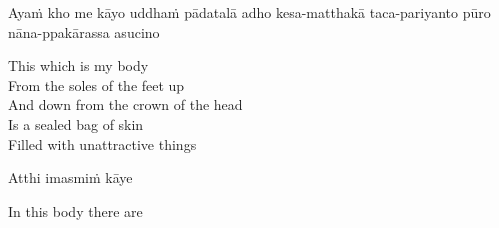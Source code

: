 \begin{pali-hang}
  Ayaṁ kho me kāyo uddhaṁ pādatalā adho kesa-matthakā taca-pariyanto pūro nāna-ppakārassa asucino
\end{pali-hang}

\begin{english-verses}
  This which is my body\\
  From the soles of the feet up\\
  And down from the crown of the head\\
  Is a sealed bag of skin\\
  Filled with unattractive things
\end{english-verses}

Atthi imasmiṁ kāye

\begin{english}
  In this body there are
\end{english}

\ifafiveversion

